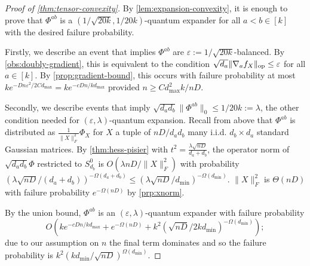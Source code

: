 \documentclass[aos]{imsart}
\newtheorem{corollary}[theorem]{Corollary}
\theoremstyle{definition}
\numberwithin{equation}{section}
\DeclareMathOperator{\op}{op}
\DeclarePairedDelimiter{\norm}{\lVert}{\rVert}
\newcommand{\eps}{\varepsilon}
\newcommand{\Sym}{\mathcal{S}}
\newcommand{\smallSym}{S}
\newcommand{\samp}{x}
\newcommand{\rv}{X}
\newcommand{\AR}[1]{{\color{orange}[AR: #1]}}
\newcommand{\TODO}[1]{{\color{blue}[TODO: #1]}}
\begin{document}
\begin{proof}[Proof of \cref{thm:tensor-convexity}] By \cref{lem:expansion-convexity}, it is enough to prove that $\Phi^{ab}$ is a $(1/\sqrt{20k}, 1/20k)$-quantum expander for all $a < b \in [k]$ with the desired failure probability. 

Firstly, we describe an event that implies $\Phi^{ab}$ are $\eps:=1/\sqrt{20k}$-balanced. By \cref{obs:doubly-gradient}, this is equivalent to the condition $\sqrt{d_a} \norm{\nabla_a f_{\rv}}_{\op} \leq \eps$ for all $a \in [k]$. By \cref{prop:gradient-bound}, this occurs with failure probability at most $k e^{-D n \eps^2/2Cd_{\max}} = k e^{ - c D n / k d_{\max}}$ provided $n \geq C  d_{\max}^2 k/n D$. 

Secondly, we describe events that imply $\sqrt{d_a d_b} \|\Phi^{ab}\|_0 \leq 1/20k:=\lambda$, the other condition needed for $(\eps, \lambda)$-quantum expansion. Recall from above that $\Phi^{ab}$ is distributed as $\frac{1}{\|X\|_F^2}\Phi_{X}$ for $X$ a tuple of $n D/d_a d_b$ many i.i.d. $d_b \times d_a $ standard Gaussian matrices. By \cref{thm:hess-pisier} with $t^2 = \frac {\lambda \sqrt{nD}}{d_a + d_b}$, the operator norm of $\sqrt{d_a d_b} \Phi$ restricted to $\smallSym^0_{d_b}$ is $O(\lambda n D /\|X\|_F^2 )$
with probability $(\lambda \sqrt{nD}/(d_a + d_b))^{ - \Omega(d_a + d_b)} \leq (\lambda \sqrt{nD} /d_{\min})^{ - \Omega(d_{\min})}$. $\|X\|_F^2$ is $\Theta(nD)$ with failure probability $e^{ -\Omega(nD)} $ by \cref{prp:xnorm}.

By the union bound, $\Phi^{ab}$ is an $(\eps, \lambda)$-quantum expander with failure probability $$O\left(k e^{ - c D n / k d_{\max}} + e^{ -\Omega(nD)} + k^2 ( \sqrt{nD} /2k d_{\min})^{ - \Omega(d_{\min})}\right); $$
due to our assumption on $n$ the final term dominates and so the failure probability is $k^2 (  k d_{\min}/\sqrt{nD})^{\Omega(d_{\min})}$.
\end{proof}





 



\end{document}
